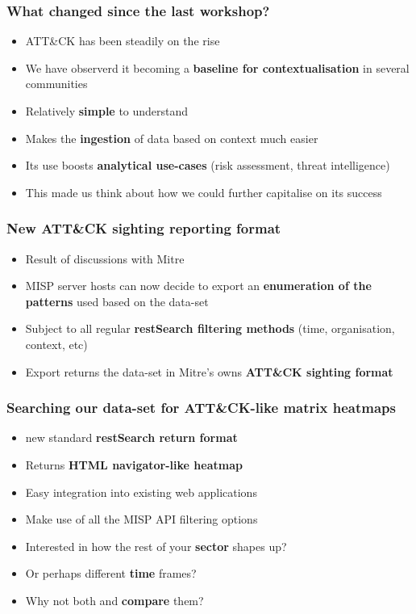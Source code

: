 
\begin{frame}
\titlepage
\end{frame}

\begin{frame}
  \frametitle{What changed since the last workshop?}
  \begin{itemize}
    \item ATT\&CK has been steadily on the rise
    \item We have observerd it becoming a {\bf baseline for contextualisation} in several communities
    \item Relatively {\bf simple} to understand
    \item Makes the {\bf ingestion} of data based on context much easier
    \item Its use boosts {\bf analytical use-cases} (risk assessment, threat intelligence)
    \item This made us think about how we could further capitalise on its success
  \end{itemize}
\end{frame}

\begin{frame}
  \frametitle{New ATT\&CK sighting reporting format}
  \begin{itemize}
    \item Result of discussions with Mitre
    \item MISP server hosts can now decide to export an {\bf enumeration of the patterns} used based on the data-set
    \item Subject to all regular {\bf restSearch filtering methods} (time, organisation, context, etc)
    \item Export returns the data-set in Mitre's owns {\bf ATT\&CK sighting format}
  \end{itemize}
\end{frame}

\begin{frame}
  \frametitle{Searching our data-set for ATT\&CK-like matrix heatmaps}
  \begin{itemize}
    \item new standard {\bf restSearch return format}
    \item Returns {\bf HTML navigator-like heatmap}
    \item Easy integration into existing web applications
    \item Make use of all the MISP API filtering options
    \item Interested in how the rest of your {\bf sector} shapes up?
    \item Or perhaps different {\bf time} frames?
    \item Why not both and {\bf compare} them?
  \end{itemize}
\end{frame}

